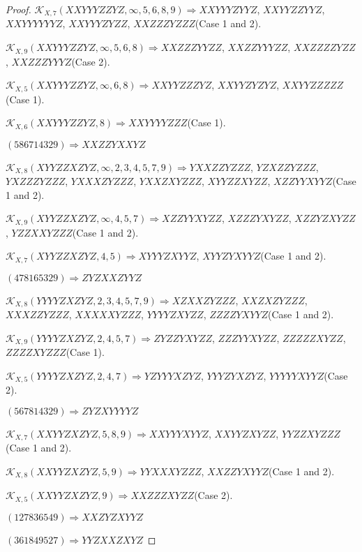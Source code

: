 \documentclass[12pt]{article}
\theoremstyle{plain}
\theoremstyle{definition}
\theoremstyle{remark}
\newcommand{\fancy}[1]{\mathcal{#1}}
\def\K{\fancy{K}}
\begin{document}
\begin{proof}
	
	
	$\K_{X,7}(XXYYYZZYZ,\infty,5, 6, 8, 9)\Rightarrow $$XXYYYZYYZ$, $XXYYZZYYZ$, $XXYYYYYYZ$, $XXYYYZYZZ$, $XXZZZYZZZ$(Case 1 and 2).
	
	$\K_{X,9}(XXYYYZZYZ,\infty,5, 6, 8)\Rightarrow $$XXZZZYYZZ$, $XXZZYYYZZ$, $XXZZZZYZZ$, $XXZZZYYYZ$(Case 2).
	
	$\K_{X,5}(XXYYYZZYZ,\infty,6, 8)\Rightarrow $$XXYYZZZYZ$, $XXYYZYZYZ$, $XXYYZZZZZ$(Case 1).
	
	$\K_{X,6}(XXYYYZZYZ,8)\Rightarrow $$XXYYYYZZZ$(Case 1).
	
	
	
	$(5 8 6 7 1 4 3 2 9)\Rightarrow XXZZYXXYZ$
	
	
	
	$\K_{X,8}(XYYZZXZYZ,\infty,2, 3, 4, 5, 7, 9)\Rightarrow $$YXXZZYZZZ$, $YZXZZYZZZ$, $YXZZZYZZZ$, $YXXXZYZZZ$, $YXXZXYZZZ$, $XYYZZXYZZ$, $XZZYYXYYZ$(Case 1 and 2).
	
	$\K_{X,9}(XYYZZXZYZ,\infty,4, 5, 7)\Rightarrow $$XZZYYXYZZ$, $XZZZYXYZZ$, $XZZYZXYZZ$, $YZZXXYZZZ$(Case 1 and 2).
	
	$\K_{X,7}(XYYZZXZYZ,4, 5)\Rightarrow $$XYYYZXYYZ$, $XYYZYXYYZ$(Case 1 and 2).
	
	
	
	$(4 7 8 1 6 5 3 2 9)\Rightarrow ZYZXXZYYZ$
	
	
	
	$\K_{X,8}(YYYYZXZYZ,2, 3, 4, 5, 7, 9)\Rightarrow $$XZXXZYZZZ$, $XXZXZYZZZ$, $XXXZZYZZZ$, $XXXXXYZZZ$, $YYYYZXYZZ$, $ZZZZYXYYZ$(Case 1 and 2).
	
	$\K_{X,9}(YYYYZXZYZ,2, 4, 5, 7)\Rightarrow $$ZYZZYXYZZ$, $ZZZYYXYZZ$, $ZZZZZXYZZ$, $ZZZZXYZZZ$(Case 1).
	
	$\K_{X,5}(YYYYZXZYZ,2, 4, 7)\Rightarrow $$YZYYYXZYZ$, $YYYZYXZYZ$, $YYYYYXYYZ$(Case 2).
	
	
	
	$(5 6 7 8 1 4 3 2 9)\Rightarrow ZYZXYYYYZ$
	
	
	
	$\K_{X,7}(XXYYZXZYZ,5, 8, 9)\Rightarrow $$XXYYYXYYZ$, $XXYYZXYZZ$, $YYZZXYZZZ$(Case 1 and 2).
	
	$\K_{X,8}(XXYYZXZYZ,5, 9)\Rightarrow $$YYXXXYZZZ$, $XXZZYXYYZ$(Case 1 and 2).
	
	$\K_{X,5}(XXYYZXZYZ,9)\Rightarrow $$XXZZZXYZZ$(Case 2).
	
	
	
	$(1 2 7 8 3 6 5 4 9)\Rightarrow XXZYZXYYZ$
	
	$(3 6 1 8 4 9 5 2 7)\Rightarrow YYZXXZXYZ$
	

\end{proof}
\end{document}

